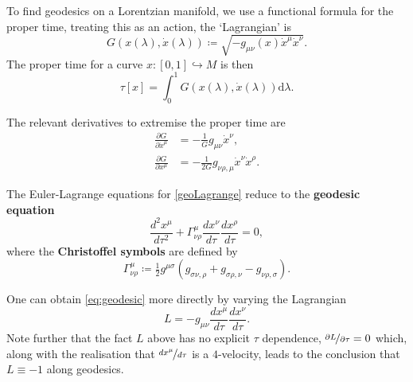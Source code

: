 \documentclass[12pt]{article}
\begin{document}
\begin{noteEquation}\label{geoLagrange}
	To find geodesics on a Lorentzian manifold, we use a functional formula for the proper time, treating this as an action, the `Lagrangian' is
		\begin{equation}
			G(x(\lambda),\dot{x}(\lambda)) \coloneqq \sqrt{-g_{\mu\nu}(x) \dot{x}^\mu \dot{x}^\nu}.
		\end{equation}
	The proper time for a curve $x: [0,1] \hookrightarrow M$ is then
		\begin{equation}
			\tau[x] = \int_0^1 G(x(\lambda),\dot{x}(\lambda)) \mathrm{d}\lambda.
		\end{equation}
\end{noteEquation}
\begin{remark}
	The relevant derivatives to extremise the proper time are
		\begin{subequations} \begin{align}
			\frac{\partial G}{\partial \dot{x}^\mu} &= -\frac{1}{G} g_{\mu\nu} \dot{x}^\nu, \\
			\frac{\partial G}{\partial x^\mu} &= - \frac{1}{2G}g_{\nu \rho,\mu} \dot{x}^\nu \dot{x}^\rho.
		\end{align} \end{subequations}
\end{remark}

\begin{noteEquation}
	The Euler-Lagrange equations for \autoref{geoLagrange} reduce to the \textbf{geodesic equation}
		\begin{equation}\label{eq:geodesic}
			\frac{d^2 x^\mu }{d \tau^2} + \Gamma^\mu_{\nu\rho} \frac{d x^\nu}{d\tau} \frac{dx^\rho}{d\tau} = 0,
		\end{equation}
	where the \textbf{Christoffel symbols} are defined by
		\begin{equation}\label{eq:Christoffel}
			\Gamma^\mu_{\nu\rho} \coloneqq \tfrac{1}{2} g^{\mu\sigma} ( g_{\sigma \nu, \rho} + g_{\sigma \rho, \nu} - g_{\nu \rho, \sigma} ).
		\end{equation}
\end{noteEquation}
\begin{remark}
	One can obtain \eqref{eq:geodesic} more directly by varying the Lagrangian
		\begin{equation}
			L = -g_{\mu\nu} \frac{dx^\mu }{d\tau}\frac{dx^\nu}{d\tau}.
		\end{equation}
	Note further that the fact $L$ above has no explicit $\tau$ dependence, $\nicefrac{\partial L}{\partial \tau} = 0$ which, along with the realisation that $\nicefrac{dx^\mu}{d\tau}$ is a $4$-velocity, leads to the conclusion that $L \equiv -1$ along geodesics.
\end{remark}
\end{document}
